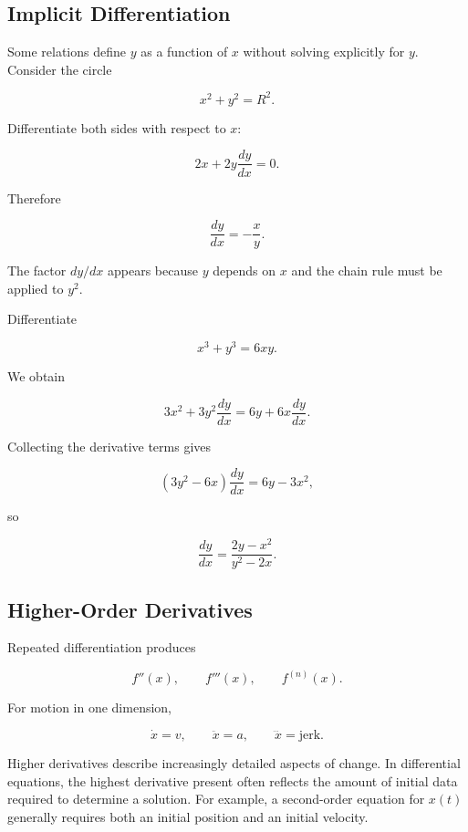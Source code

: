 \subsection{Implicit Differentiation}

Some relations define $y$ as a function of $x$ without solving explicitly for $y$. Consider the circle

\[
x^2+y^2=R^2.
\]

Differentiate both sides with respect to $x$:

\[
2x+2y\frac{dy}{dx}=0.
\]

Therefore

\begin{equation}
\boxed{
\frac{dy}{dx}=-\frac{x}{y}.
}
\label{eq:circle-implicit-derivative}
\end{equation}

The factor $dy/dx$ appears because $y$ depends on $x$ and the chain rule must be applied to $y^2$.

\begin{bookexample}
Differentiate

\[
x^3+y^3=6xy.
\]

We obtain

\[
3x^2+3y^2\frac{dy}{dx}
=6y+6x\frac{dy}{dx}.
\]

Collecting the derivative terms gives

\[
(3y^2-6x)\frac{dy}{dx}=6y-3x^2,
\]

so

\[
\boxed{
\frac{dy}{dx}
=
\frac{2y-x^2}{y^2-2x}.
}
\]
\end{bookexample}

\subsection{Higher-Order Derivatives}

Repeated differentiation produces

\[
f''(x),
\qquad
f'''(x),
\qquad
f^{(n)}(x).
\]

For motion in one dimension,

\[
\dot x=v,
\qquad
\ddot x=a,
\qquad
\dddot x=\text{jerk}.
\]

Higher derivatives describe increasingly detailed aspects of change. In differential equations, the highest derivative present often reflects the amount of initial data required to determine a solution. For example, a second-order equation for $x(t)$ generally requires both an initial position and an initial velocity.

